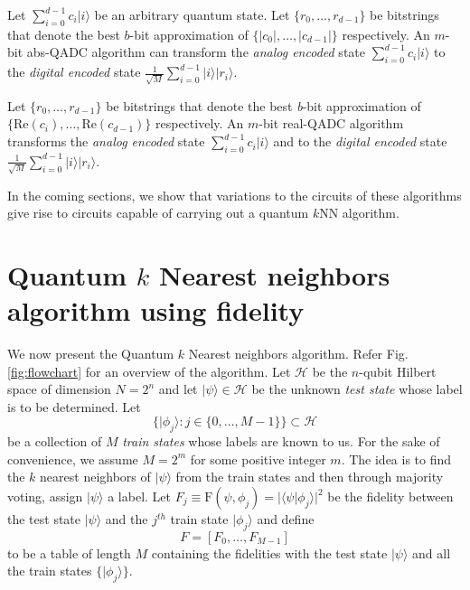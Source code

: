\documentclass[a4paper,twocolumn,11pt,unpublished]{quantumarticle}
\newcommand{\rang}{\rangle}
\newcommand{\lang}{\langle}
\begin{document}
    Let $\sum_{i=0}^{d-1} c_i |i\rang$ be an arbitrary quantum state. Let $\{r_0, \ldots, r_{d-1}\}$ be bitstrings that denote the best $b$-bit approximation of $\{|c_0|, \ldots, |c_{d-1}|\}$ respectively. An $m$-bit abs-QADC algorithm can transform the \textit{analog encoded} state $\sum_{i=0}^{d-1} c_i |i\rang$ to the \textit{digital encoded} state $\frac1{\sqrt{M}}\sum_{i=0}^{d-1} |i\rang |r_i\rang$. 
    
    Let $\{r_0, \ldots, r_{d-1}\}$ be bitstrings that denote the best \textit{b}-bit approximation of $\{\text{Re}(c_i), \ldots, \text{Re}(c_{d-1})\}$ respectively. An $m$-bit real-QADC algorithm transforms the \textit{analog encoded} state $\sum_{i=0}^{d-1} c_i |i\rang$ and to the \textit{digital encoded} state $\frac1{\sqrt{M}}\sum_{i=0}^{d-1} |i\rang |r_i\rang$. 

    In the coming sections, we show that variations to the circuits of these algorithms give rise to circuits capable of carrying out a quantum $k$NN algorithm.




\section{Quantum $k$ Nearest neighbors algorithm using fidelity}\label{Sec:QKNN}
    
    We now present the Quantum $k$ Nearest neighbors algorithm. Refer Fig. \ref{fig:flowchart} for an overview of the algorithm. Let $\mathcal{H}$ be the $n$-qubit Hilbert space of dimension $N = 2^{n}$ and let $|\psi\rang \in \mathcal H $ be the unknown \textit{test state} whose label is to be determined. Let  
    \begin{equation}
        \{|\phi_j\rangle : j \in \{0, \ldots, M-1\}\} \subset \mathcal H
    \end{equation}
    be a collection of $M$ \textit{train states} whose labels are known to us. For the sake of convenience, we assume $M = 2^m$ for some positive integer $m$. The idea is to find the $k$ nearest neighbors of $| \psi \rang$ from the train states and then through majority voting, assign $| \psi \rang$ a label. Let $F_j \equiv \text{F}(\psi, \phi_j) = |\lang \psi|\phi_j \rang|^2$ be the fidelity between the test state $|\psi\rang$ and the $j^{th}$ train state $|\phi_j\rang$ and define
    \begin{equation}
        F = [F_0, \ldots, F_{M-1}]
        \label{Ftable}
    \end{equation}
    to be a table of length $M$ containing the fidelities with the test state $|\psi\rangle$ and all the train states $\{| \phi_j \rang\}$. 
    
\end{document}
